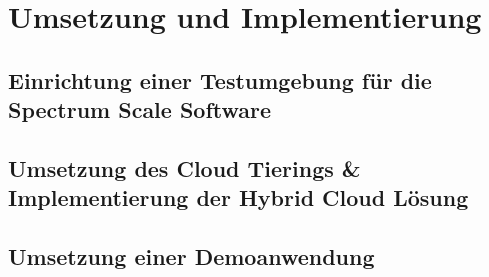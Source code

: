 \chapter{Umsetzung und Implementierung}\label{ch:realization}

\section{Einrichtung einer Testumgebung für die Spectrum Scale Software}
\section{Umsetzung des Cloud Tierings \& Implementierung der Hybrid Cloud Lösung}
\section{Umsetzung einer Demoanwendung}